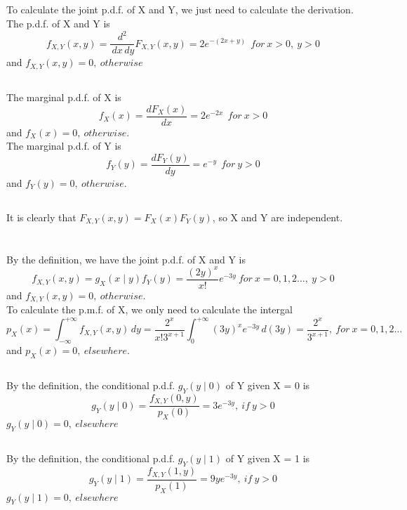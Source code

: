\documentclass[10.5pt]{article}
\begin{document}
\subsection{}
To calculate the joint p.d.f. of X and Y, we just need to calculate the derivation. The p.d.f. of X and Y is $$f_{X,Y}(x,y) = \frac{d^2}{\,dx \,dy}F_{X,Y}(x,y) = 2e^{-(2x+y)} ~~for ~x>0,~y>0$$ and $f_{X,Y}(x,y) = 0, ~otherwise$
\subsection{}
The marginal p.d.f. of X is $$f_X(x) = \frac{d F_X(x)}{dx} = 2e^{-2x} ~~for ~x>0$$ and $f_X(x) = 0, ~otherwise.$ \\\indent
The marginal p.d.f. of Y is $$f_Y(y) = \frac{d F_Y(y)}{dy} = e^{-y} ~~for ~y>0$$ and $f_Y(y) = 0, ~otherwise.$ \\\indent
\subsection{}
It is clearly that $F_{X,Y}(x,y) = F_X(x)F_Y(y)$, so X and Y are independent.

\section{}
\subsection{}
By the definition, we have the joint p.d.f. of X and Y is $$f_{X,Y}(x,y) = g_X(x\mid y) f_Y(y) = \frac{(2y)^x}{x!}e^{-3y} ~for ~x=0,1,2\dots,~y>0$$ and $f_{X,Y}(x,y) = 0, ~otherwise.$\\\indent
To calculate the p.m.f. of X, we only need to calculate the intergal $$p_X(x) = \int_{-\infty}^{+\infty} f_{X,Y}(x,y) \,dy = \frac{2^x}{x!3^{x+1}} \int_0^{+\infty} (3y)^x e^{-3y} \,d(3y) = \frac{2^x}{3^{x+1}}, ~for ~x=0,1,2\dots$$ and $p_X(x) = 0, ~elsewhere.$
\subsection{}
By the definition, the conditional p.d.f. $g_Y(y\mid 0)$ of Y given X = 0 is $$g_Y(y\mid 0) = \frac{f_{X,Y}(0,y)}{p_X(0)} = 3e^{-3y},~if ~y>0$$ $g_Y(y\mid 0) = 0, ~elsewhere$
\subsection{}
By the definition, the conditional p.d.f. $g_Y(y\mid 1)$ of Y given X = 1 is $$g_Y(y\mid 1) = \frac{f_{X,Y}(1,y)}{p_X(1)} = 9ye^{-3y},~if ~y>0$$ $g_Y(y\mid 1) = 0, ~elsewhere$
\end{document}
